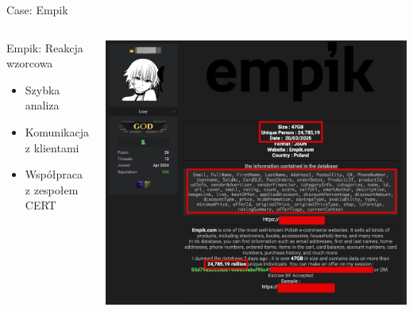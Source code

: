 \begin{frame}{Case: Empik}
\begin{columns}[c]
    \begin{exampleblock}{Empik: Reakcja wzorcowa}
    \begin{itemize}
      \item Szybka analiza
      \item Komunikacja z klientami
      \item Współpraca z zespołem CERT
    \end{itemize}
    \end{exampleblock}
    \includegraphics[width=1\textwidth]{images/empik-wyciek.jpg}
\end{columns}
\end{frame}

